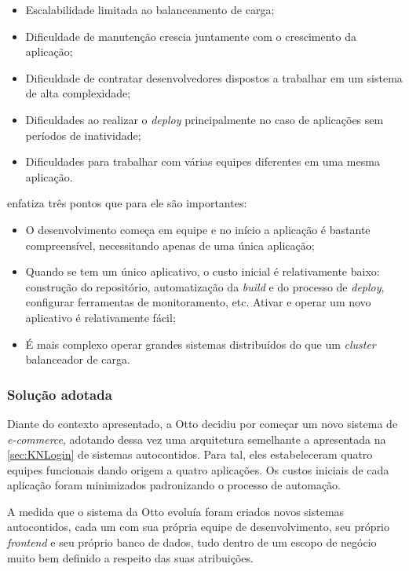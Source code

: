 \begin{itemize}
    \item Escalabilidade limitada ao balanceamento de carga;
    \item Dificuldade de manutenção crescia juntamente com o crescimento da aplicação;
    \item Dificuldade de contratar desenvolvedores dispostos a trabalhar em um sistema de alta
        complexidade;
    \item Dificuldades ao realizar o \textit{deploy} principalmente no caso de aplicações sem
        períodos de inatividade;
    \item Dificuldades para trabalhar com várias equipes diferentes em uma mesma aplicação.
\end{itemize}

 enfatiza três pontos que para ele são importantes:

\begin{itemize}
    \item O desenvolvimento começa em equipe e no início a aplicação é bastante compreensível,
        necessitando apenas de uma única aplicação;
    \item Quando se tem um único aplicativo, o custo inicial é relativamente baixo: construção do
        repositório, automatização da \textit{build} e do processo de \textit{deploy}, configurar
        ferramentas de monitoramento, etc. Ativar e operar um novo aplicativo é relativamente fácil;
    \item É mais complexo operar grandes sistemas distribuídos do que um \textit{cluster}
        balanceador de carga.
\end{itemize}

\subsubsection{Solução adotada}

Diante do contexto apresentado, a Otto decidiu por começar um novo sistema de \textit{e-commerce},
adotando dessa vez uma arquitetura semelhante a apresentada na \autoref{sec:KNLogin} de sistemas autocontidos. Para
tal, eles estabeleceram quatro equipes funcionais dando origem a quatro aplicações. Os custos
iniciais de cada aplicação foram minimizados padronizando o processo de automação.

A medida que o sistema da Otto evoluía foram criados novos sistemas autocontidos, cada um com sua própria equipe
de desenvolvimento, seu próprio \textit{frontend} e seu próprio
banco de dados, tudo dentro de um escopo de negócio muito bem definido a respeito das suas
atribuições.

